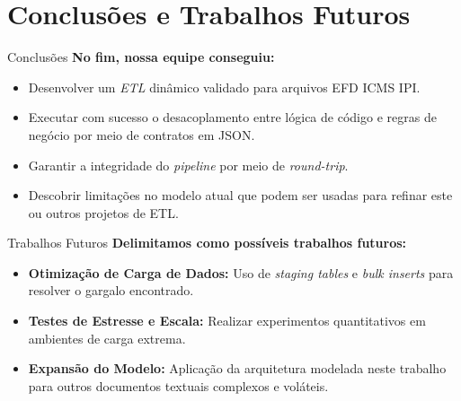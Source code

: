 \section{Conclusões e Trabalhos Futuros}

\begin{frame}{Conclusões}
  \textbf{No fim, nossa equipe conseguiu:}
  \begin{itemize}
    \item Desenvolver um \textit{ETL} dinâmico validado para arquivos EFD ICMS IPI.
    \item Executar com sucesso o desacoplamento entre lógica de código e regras de negócio por meio de contratos em JSON.
    \item Garantir a integridade do \textit{pipeline} por meio de \textit{round-trip}.
    \item Descobrir limitações no modelo atual que podem ser usadas para refinar este ou outros projetos de ETL.
  \end{itemize}
\end{frame}

\begin{frame}{Trabalhos Futuros}
    \textbf{Delimitamos como possíveis trabalhos futuros:}
    \begin{itemize}
      \item \textbf{Otimização de Carga de Dados:} Uso de \textit{staging tables} e \textit{bulk inserts} para resolver o gargalo encontrado.
      \item \textbf{Testes de Estresse e Escala:} Realizar experimentos quantitativos em ambientes de carga extrema.
      \item \textbf{Expansão do Modelo:} Aplicação da arquitetura modelada neste trabalho para outros documentos textuais complexos e voláteis.
    \end{itemize}
\end{frame}